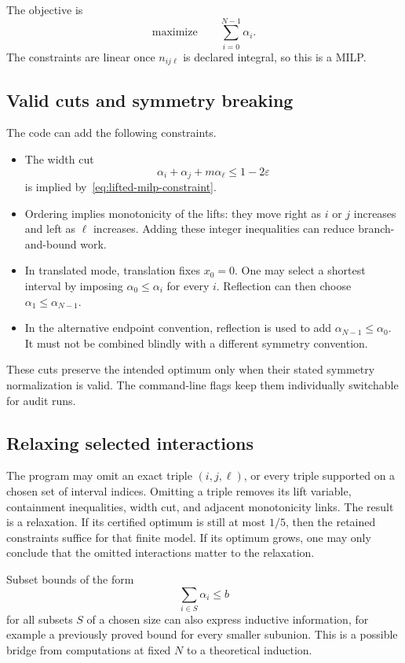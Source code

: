 The objective is
\[
    \text{maximize}\qquad \sum_{i=0}^{N-1}\alpha_i.
\]
The constraints are linear once \(n_{ij\ell}\) is declared integral, so this
is a MILP.

\subsection{Valid cuts and symmetry breaking}

The code can add the following constraints.
\begin{itemize}
    \item The width cut
    \[
        \alpha_i+\alpha_j+m\alpha_\ell\leq1-2\varepsilon
    \]
    is implied by~\eqref{eq:lifted-milp-constraint}.
    \item Ordering implies monotonicity of the lifts: they move right as
    \(i\) or \(j\) increases and left as \(\ell\) increases.  Adding these
    integer inequalities can reduce branch-and-bound work.
    \item In translated mode, translation fixes \(x_0=0\).  One may select a
    shortest interval by imposing \(\alpha_0\leq\alpha_i\) for every \(i\).
    Reflection can then choose \(\alpha_1\leq\alpha_{N-1}\).
    \item In the alternative endpoint convention, reflection is used to add
    \(\alpha_{N-1}\leq\alpha_0\).  It must not be combined blindly with a
    different symmetry convention.
\end{itemize}
These cuts preserve the intended optimum only when their stated symmetry
normalization is valid.  The command-line flags keep them individually
switchable for audit runs.

\subsection{Relaxing selected interactions}

The program may omit an exact triple \((i,j,\ell)\), or every triple supported
on a chosen set of interval indices.  Omitting a triple removes its lift
variable, containment inequalities, width cut, and adjacent monotonicity
links.  The result is a relaxation.  If its certified optimum is still at
most \(1/5\), then the retained constraints suffice for that finite model.  If
its optimum grows, one may only conclude that the omitted interactions matter
to the relaxation.

Subset bounds of the form
\[
    \sum_{i\in S}\alpha_i\leq b
\]
for all subsets \(S\) of a chosen size can also express inductive information,
for example a previously proved bound for every smaller subunion.  This is a
possible bridge from computations at fixed \(N\) to a theoretical induction.

